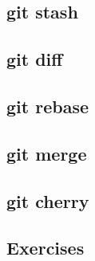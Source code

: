 \subsection{git stash}
\begin{frame}[fragile]
    \subslidetitle
\end{frame}

\subsection{git diff}
\begin{frame}[fragile]
    \subslidetitle
\end{frame}

\subsection{git rebase}
\begin{frame}[fragile]
    \subslidetitle
\end{frame}

\subsection{git merge}
\begin{frame}[fragile]
    \subslidetitle
\end{frame}

\subsection{git cherry}
\begin{frame}[fragile]
    \subslidetitle
\end{frame}

\subsection{Exercises}
\begin{frame}[fragile]
  \subslidetitle
\end{frame}
